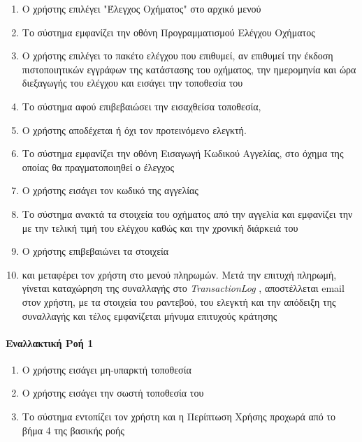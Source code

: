 \documentclass{../ol-softwaremanual}
\begin{document}
	\begin{enumerate}
		\item Ο χρήστης επιλέγει \en"\gr Έλεγχος Οχήματος\en" \gr στο αρχικό μενού
		\item Το σύστημα εμφανίζει την οθόνη Προγραμματισμού Ελέγχου Οχήματος
		\item Ο χρήστης επιλέγει το πακέτο ελέγχου που επιθυμεί, αν επιθυμεί την έκδοση πιστοποιητικών εγγράφων της κατάστασης του οχήματος, την ημερομηνία και ώρα διεξαγωγής του ελέγχου και εισάγει την τοποθεσία του
		\item Το σύστημα αφού επιβεβαιώσει την εισαχθείσα τοποθεσία, 		
		\item Ο χρήστης αποδέχεται ή όχι τον προτεινόμενο ελεγκτή. 
		\item Το σύστημα εμφανίζει την οθόνη Εισαγωγή Κωδικού Αγγελίας, στο όχημα της οποίας θα πραγματοποιηθεί ο έλεγχος		
		\item Ο χρήστης εισάγει τον κωδικό της αγγελίας
		\item Το σύστημα ανακτά τα στοιχεία του οχήματος από την αγγελία και εμφανίζει την  με την τελική τιμή του ελέγχου καθώς και την χρονική διάρκειά του
		\item Ο χρήστης επιβεβαιώνει τα στοιχεία
		\item {} και μεταφέρει τον χρήστη στο μενού πληρωμών. Μετά την επιτυχή πληρωμή, γίνεται καταχώρηση της συναλλαγής στο \en \textit{TransactionLog} \gr, αποστέλλεται \en email \gr στον χρήστη, με τα στοιχεία του ραντεβού, του ελεγκτή και την απόδειξη της συναλλαγής και τέλος εμφανίζεται μήνυμα επιτυχούς κράτησης
	\end{enumerate}
	
	\paragraph{Εναλλακτική Ροή 1}
	
	\begin{enumerate}
		\item Ο χρήστης εισάγει μη-υπαρκτή τοποθεσία
		\item Ο χρήστης εισάγει την σωστή τοποθεσία του
		\item Το σύστημα εντοπίζει τον χρήστη και η Περίπτωση Χρήσης προχωρά από το βήμα 4 της βασικής ροής
	\end{enumerate}
\end{document}
